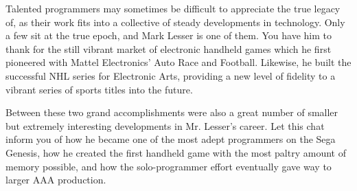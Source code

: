Talented programmers may sometimes be difficult to appreciate the true legacy of, as their work fits into a collective of steady developments in technology. Only a few sit at the true epoch, and Mark Lesser is one of them. You have him to thank for the still vibrant market of electronic handheld games which he first pioneered with Mattel Electronics’ Auto Race and Football. Likewise, he built the successful NHL series for Electronic Arts, providing a new level of fidelity to a vibrant series of sports titles into the future.

Between these two grand accomplishments were also a great number of smaller but extremely interesting developments in Mr. Lesser’s career. Let this chat inform you of how he became one of the most adept programmers on the Sega Genesis, how he created the first handheld game with the most paltry amount of memory possible, and how the solo-programmer effort eventually gave way to larger AAA production.

\noindent\makebox[\linewidth]{\rule{\paperwidth}{0.4pt}}
